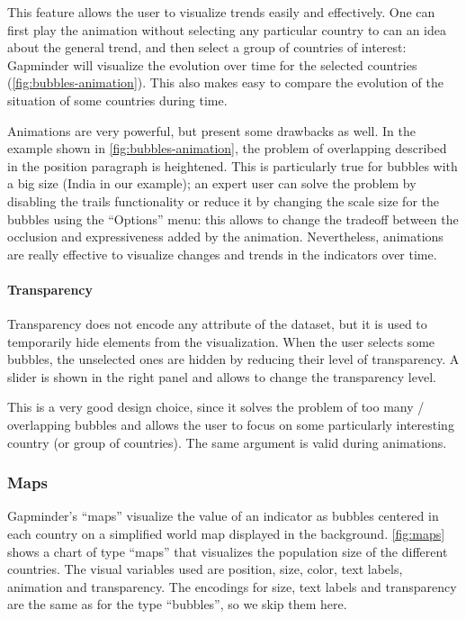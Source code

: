 This feature allows the user to visualize trends easily and effectively.
One can first play the animation without selecting any particular country to can an idea about the general trend, and then select a group of countries of interest:
Gapminder will visualize the evolution over time for the selected countries (\cref{fig:bubbles-animation}).
This also makes easy to compare the evolution of the situation of some countries during time.

Animations are very powerful, but present some drawbacks as well.
In the example shown in \cref{fig:bubbles-animation}, the problem of overlapping described in the position paragraph is heightened.
This is particularly true for bubbles with a big size (India in our example);
an expert user can solve the problem by disabling the trails functionality or reduce it by changing the scale size for the bubbles using the ``Options'' menu:
this allows to change the tradeoff between the occlusion and expressiveness added by the animation.
Nevertheless, animations are really effective to visualize changes and trends in the indicators over time.

\paragraph{Transparency}
Transparency does not encode any attribute of the dataset, but it is used to temporarily hide elements from the visualization.
When the user selects some bubbles, the unselected ones are hidden by reducing their level of transparency.
A slider is shown in the right panel and allows to change the transparency level.

This is a very good design choice, since it solves the problem of too many / overlapping bubbles and allows the user to focus on some particularly interesting country (or group of countries).
The same argument is valid during animations.


\subsubsection{Maps}
Gapminder's ``maps'' visualize the value of an indicator as bubbles centered in each country on a simplified world map displayed in the background.
\cref{fig:maps} shows a chart of type ``maps'' that visualizes the population size of the different countries.
The visual variables used are position, size, color, text labels, animation and transparency.
The encodings for size, text labels and transparency are the same as for the type ``bubbles'', so we skip them here.

